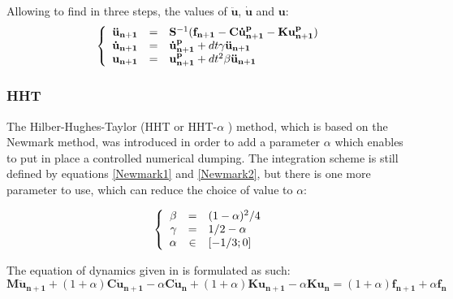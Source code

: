 \documentclass[12pt,a4paper]{article}
\begin{document}
\noindent
Allowing to find in three steps, the values of $\mathbf{\ddot{u}}$, $\mathbf{\dot{u}}$ and $\mathbf{u}$:
\begin{equation}
	\left\{
		\begin{array}{r c l}
			\mathbf{\ddot{u}_{n+1}} 
			&=& \mathbf{S}^{-1} (  \mathbf{f_{n+1}} - \mathbf{C} \mathbf{\dot{u}^p_{n+1}} - \mathbf{K} \mathbf{u^p_{n+1}}  )
			\\
			\mathbf{\dot{u}_{n+1}} &=& \mathbf{\dot{u}^p_{n+1}} + dt \gamma \mathbf{\ddot{u}_{n+1}}
			\\
			\mathbf{u_{n+1}} &=& \mathbf{u^p_{n+1}} + dt^2 \beta \mathbf{\ddot{u}_{n+1}}
		\end{array}
	\right.
\end{equation}


\subsubsection{HHT}
The Hilber-Hughes-Taylor (HHT or HHT-$\alpha$ \cite{HHT2}) method, which is based on the Newmark method, was introduced in order to add a parameter $\alpha$ which enables to put in place a controlled numerical dumping.
The integration scheme is still defined by equations \ref{Newmark1} and \ref{Newmark2}, but there is one more parameter to use, which can reduce the choice of value to $\alpha$:

\begin{equation}
	\left\{
		\begin{array}{r c l}
			\beta &=& ( 1- \alpha )^{2}/4
			\\
			\gamma &=& 1/2 - \alpha
			\\
			\alpha &\in& [-1/3;0]
		\end{array}
	\right.
\end{equation}

\noindent
The equation of dynamics given in \cite{HHT} is formulated as such:
\begin{equation}
	\mathbf{M}{\mathbf{\ddot{u}_{n+1}}} 
	+ (1+\alpha)\mathbf{C}{\mathbf{\dot{u}_{n+1}}}
	- \alpha \mathbf{C}{\mathbf{\dot{u}_n}}
	+ (1+\alpha) \mathbf{K} \mathbf{u_{n+1}}
	- \alpha \mathbf{K} \mathbf{u_n}
	= (1+\alpha)\mathbf{f_{n+1}}  + \alpha \mathbf{f_n}
\end{equation}
\end{document}
